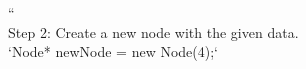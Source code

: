 \documentclass[preview]{standalone}
\begin{document}
``\\Step 2: Create a new node with the given data.\\`Node* newNode = new Node(4);`\\
\end{document}
